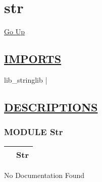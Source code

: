 \chapter*{\color{headfile}
str
}
\hypertarget{ecldoc:toc:str}{}
\hyperlink{ecldoc:toc:root}{Go Up}

\section*{\underline{\textsf{IMPORTS}}}
\begin{doublespace}
{\large
lib\_stringlib |
}
\end{doublespace}

\section*{\underline{\textsf{DESCRIPTIONS}}}
\subsection*{\textsf{\colorbox{headtoc}{\color{white} MODULE}
Str}}

\hypertarget{ecldoc:Str}{}

{\renewcommand{\arraystretch}{1.5}
\begin{tabularx}{\textwidth}{|>{\raggedright\arraybackslash}l|X|}
\hline
\hspace{0pt}\mytexttt{\color{red} } & \textbf{Str} \\
\hline
\end{tabularx}
}

\par





No Documentation Found







